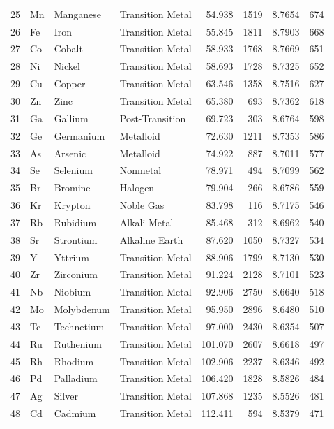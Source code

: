 \documentclass[11pt,a4paper]{article}
\begin{document}
\begin{longtable}{rlllrrrr}
  25 & Mn & Manganese & Transition Metal & 54.938 & 1519 & 8.7654 & 674 \\
  26 & Fe & Iron & Transition Metal & 55.845 & 1811 & 8.7903 & 668 \\
  27 & Co & Cobalt & Transition Metal & 58.933 & 1768 & 8.7669 & 651 \\
  28 & Ni & Nickel & Transition Metal & 58.693 & 1728 & 8.7325 & 652 \\
  29 & Cu & Copper & Transition Metal & 63.546 & 1358 & 8.7516 & 627 \\
  30 & Zn & Zinc & Transition Metal & 65.380 & 693 & 8.7362 & 618 \\
  31 & Ga & Gallium & Post-Transition & 69.723 & 303 & 8.6764 & 598 \\
  32 & Ge & Germanium & Metalloid & 72.630 & 1211 & 8.7353 & 586 \\
  33 & As & Arsenic & Metalloid & 74.922 & 887 & 8.7011 & 577 \\
  34 & Se & Selenium & Nonmetal & 78.971 & 494 & 8.7099 & 562 \\
  35 & Br & Bromine & Halogen & 79.904 & 266 & 8.6786 & 559 \\
  36 & Kr & Krypton & Noble Gas & 83.798 & 116 & 8.7175 & 546 \\
  37 & Rb & Rubidium & Alkali Metal & 85.468 & 312 & 8.6962 & 540 \\
  38 & Sr & Strontium & Alkaline Earth & 87.620 & 1050 & 8.7327 & 534 \\
  39 & Y & Yttrium & Transition Metal & 88.906 & 1799 & 8.7130 & 530 \\
  40 & Zr & Zirconium & Transition Metal & 91.224 & 2128 & 8.7101 & 523 \\
  41 & Nb & Niobium & Transition Metal & 92.906 & 2750 & 8.6640 & 518 \\
  42 & Mo & Molybdenum & Transition Metal & 95.950 & 2896 & 8.6480 & 510 \\
  43 & Tc & Technetium & Transition Metal & 97.000 & 2430 & 8.6354 & 507 \\
  44 & Ru & Ruthenium & Transition Metal & 101.070 & 2607 & 8.6618 & 497 \\
  45 & Rh & Rhodium & Transition Metal & 102.906 & 2237 & 8.6346 & 492 \\
  46 & Pd & Palladium & Transition Metal & 106.420 & 1828 & 8.5826 & 484 \\
  47 & Ag & Silver & Transition Metal & 107.868 & 1235 & 8.5526 & 481 \\
  48 & Cd & Cadmium & Transition Metal & 112.411 & 594 & 8.5379 & 471 \\

\end{longtable}
\end{document}
